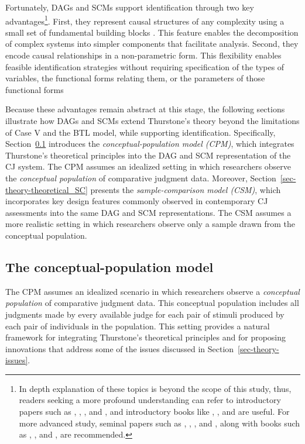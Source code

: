 \documentclass[
  authoryear,
  review,
  1p]{elsarticle}
\begin{document}
Fortunately, DAGs and SCMs support identification through two key
advantages\footnote{In depth explanation of these topics is beyond the
  scope of this study, thus, readers seeking a more profound
  understanding can refer to introductory papers such as
  \citet{Pearl_2010}, \citet{Rohrer_2018}, \citet{Pearl_2019}, and
  \citet{Cinelli_et_al_2020}, and introductory books like
  \citet{Pearl_et_al_2018}, \citet{Neal_2020}, and
  \citet{McElreath_2020} are useful. For more advanced study, seminal
  papers such as \citet{Neyman_et_al_1923}, \citet{Rubin_1974},
  \citet{Spirtes_et_al_1991}, and \citet{Sekhon_2009}, along with books
  such as \citet{Pearl_2009}, \citet{Morgan_et_al_2014}, and
  \citet{Hernan_et_al_2025}, are recommended.}. First, they represent
causal structures of any complexity using a small set of fundamental
building blocks \citep{Neal_2020, McElreath_2026}. This feature enables
the decomposition of complex systems into simpler components that
facilitate analysis. Second, they encode causal relationships in a
non-parametric form. This flexibility enables feasible identification
strategies without requiring specification of the types of variables,
the functional forms relating them, or the parameters of those
functional forms \citep{Pearl_et_al_2016}

Because these advantages remain abstract at this stage, the following
sections illustrate how DAGs and SCMs extend Thurstone's theory beyond
the limitations of Case V and the BTL model, while supporting
identification. Specifically, Section~\ref{sec-theory-theoretical_P}
introduces the \emph{conceptual-population model (CPM)}, which
integrates Thurstone's theoretical principles into the DAG and SCM
representation of the CJ system. The CPM assumes an idealized setting in
which researchers observe the \emph{conceptual population} of
comparative judgment data. Moreover,
Section~\ref{sec-theory-theoretical_SC} presents the
\emph{sample-comparison model (CSM)}, which incorporates key design
features commonly observed in contemporary CJ assessments into the same
DAG and SCM representations. The CSM assumes a more realistic setting in
which researchers observe only a sample drawn from the conceptual
population.

\subsection{The conceptual-population
model}\label{sec-theory-theoretical_P}

The CPM assumes an idealized scenario in which researchers observe a
\emph{conceptual population} of comparative judgment data. This
conceptual population includes all judgments made by every available
judge for each pair of stimuli produced by each pair of individuals in
the population. This setting provides a natural framework for
integrating Thurstone's theoretical principles and for proposing
innovations that address some of the issues discussed in
Section~\ref{sec-theory-issues}.
\end{document}
